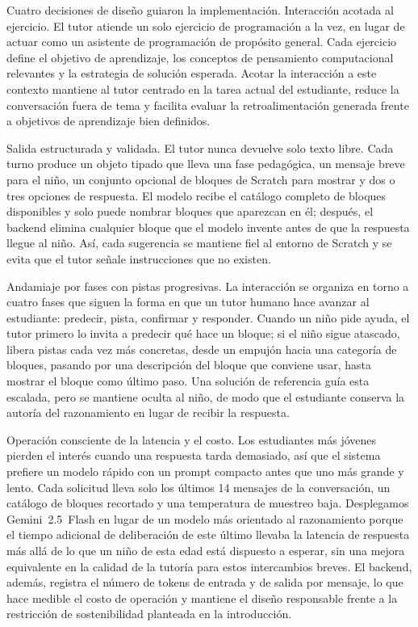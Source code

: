 \documentclass[conference]{IEEEtran}
\begin{document}
Cuatro decisiones de diseño guiaron la implementación.
Interacción acotada al ejercicio. El tutor atiende un solo ejercicio de programación a la vez, en lugar de actuar como un asistente de programación de propósito general. Cada ejercicio define el objetivo de aprendizaje, los conceptos de pensamiento computacional relevantes y la estrategia de solución esperada. Acotar la interacción a este contexto mantiene al tutor centrado en la tarea actual del estudiante, reduce la conversación fuera de tema y facilita evaluar la retroalimentación generada frente a objetivos de aprendizaje bien definidos.

Salida estructurada y validada. El tutor nunca devuelve solo texto libre. Cada turno produce un objeto tipado que lleva una fase pedagógica, un mensaje breve para el niño, un conjunto opcional de bloques de Scratch para mostrar y dos o tres opciones de respuesta. El modelo recibe el catálogo completo de bloques disponibles y solo puede nombrar bloques que aparezcan en él; después, el backend elimina cualquier bloque que el modelo invente antes de que la respuesta llegue al niño. Así, cada sugerencia se mantiene fiel al entorno de Scratch y se evita que el tutor señale instrucciones que no existen.

Andamiaje por fases con pistas progresivas. La interacción se organiza en torno a cuatro fases que siguen la forma en que un tutor humano hace avanzar al estudiante: predecir, pista, confirmar y responder. Cuando un niño pide ayuda, el tutor primero lo invita a predecir qué hace un bloque; si el niño sigue atascado, libera pistas cada vez más concretas, desde un empujón hacia una categoría de bloques, pasando por una descripción del bloque que conviene usar, hasta mostrar el bloque como último paso. Una solución de referencia guía esta escalada, pero se mantiene oculta al niño, de modo que el estudiante conserva la autoría del razonamiento en lugar de recibir la respuesta.

Operación consciente de la latencia y el costo. Los estudiantes más jóvenes pierden el interés cuando una respuesta tarda demasiado, así que el sistema prefiere un modelo rápido con un prompt compacto antes que uno más grande y lento. Cada solicitud lleva solo los últimos 14 mensajes de la conversación, un catálogo de bloques recortado y una temperatura de muestreo baja. Desplegamos Gemini~2.5~Flash en lugar de un modelo más orientado al razonamiento porque el tiempo adicional de deliberación de este último llevaba la latencia de respuesta más allá de lo que un niño de esta edad está dispuesto a esperar, sin una mejora equivalente en la calidad de la tutoría para estos intercambios breves. El backend, además, registra el número de tokens de entrada y de salida por mensaje, lo que hace medible el costo de operación y mantiene el diseño responsable frente a la restricción de sostenibilidad planteada en la introducción.
\end{document}

